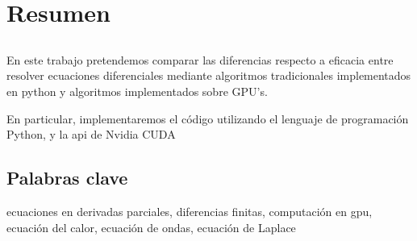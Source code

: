 \chapter*{Resumen}

\section*{\tituloPortadaVal}


En este trabajo pretendemos comparar las diferencias respecto a eficacia entre resolver ecuaciones diferenciales mediante algoritmos tradicionales implementados en python y algoritmos implementados sobre GPU's.

En particular, implementaremos el código utilizando el lenguaje de programación Python, y la api de Nvidia CUDA


\section*{Palabras clave}
   

\noindent ecuaciones en derivadas parciales, diferencias finitas, computación en gpu, ecuación del calor, ecuación de ondas, ecuación de Laplace






